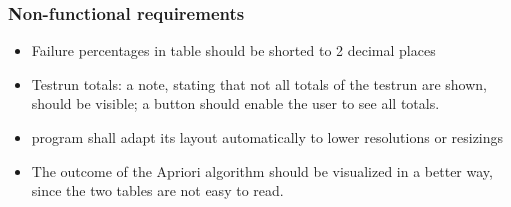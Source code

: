 \subsubsection{Non-functional requirements}
\begin{itemize}

\item Failure percentages in table should be shorted to 2 decimal places
\item Testrun totals: a note, stating that not all totals of the testrun are shown, should be visible; a button should enable the user to see all totals.

\item program shall adapt its layout automatically to lower resolutions or resizings
\item The outcome of the Apriori algorithm should be visualized in a better way, since the two tables are not easy to read.
\end{itemize}